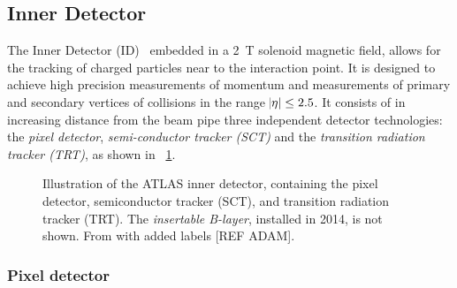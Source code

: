 \subsection{Inner Detector}\label{sec:method:ID}

The Inner Detector (ID)~\cite{ATLAS:ID-TDR} embedded in a \SI{2}{\tesla} solenoid magnetic field, allows for the tracking of charged particles near to the interaction point. It is designed to achieve high precision measurements of momentum and measurements of primary and secondary vertices of collisions in the range $\abs{\eta} \leq 2.5$. It consists of in increasing distance from the beam pipe three independent detector technologies: the \emph{pixel detector}, \emph{semi-conductor tracker (SCT)} and the \emph{transition radiation tracker (TRT)}, as shown in  ~\cref{fig:method:ATLAS:ID}. 

\begin{figure}
    \centering
    \caption[Illustration of the ATLAS inner detector]{Illustration of the ATLAS inner detector, containing the pixel detector, semiconductor tracker (SCT), and transition radiation tracker (TRT). The \emph{insertable B-layer}, installed in 2014, is not shown. From \cite{ATLASIDImage} with added labels [REF ADAM].}
    \label{fig:method:ATLAS:ID}
\end{figure}

\subsubsection{Pixel detector}

